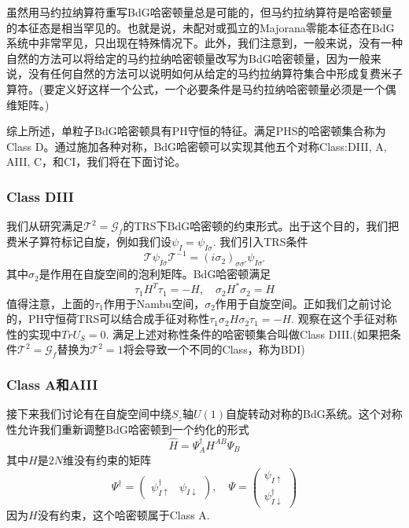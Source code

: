 \documentclass[a4paper]{article}
\numberwithin{equation}{subsection}
\newcommand{\mT}{\mathcal{T}}
\begin{document}
虽然用马约拉纳算符重写BdG哈密顿量总是可能的，但马约拉纳算符是哈密顿量的本征态是相当罕见的。也就是说，未配对或孤立的Majorana零能本征态在BdG系统中非常罕见，只出现在特殊情况下。此外，我们注意到，一般来说，没有一种自然的方法可以将给定的马约拉纳哈密顿量改写为BdG哈密顿量，因为一般来说，没有任何自然的方法可以说明如何从给定的马约拉纳算符集合中形成复费米子算符。(要定义好这样一个公式，一个必要条件是马约拉纳哈密顿量必须是一个偶维矩阵。)

综上所述，单粒子BdG哈密顿具有PH守恒的特征。满足PHS的哈密顿集合称为Class D。通过施加各种对称，BdG哈密顿可以实现其他五个对称Class:DIII, A, AIII, C，和CI，我们将在下面讨论。
\subsubsection{Class DIII}
我们从研究满足$\mT^2=\mathcal{G}_f$的TRS下BdG哈密顿的约束形式。出于这个目的，我们把费米子算符标记自旋，例如我们设$\psi_I=\psi_{I\sigma}$. 我们引入TRS条件
\begin{equation}
    \mT\psi_{I\sigma}\mT^{-1}=(i\sigma_2)_{\sigma\sigma'}\psi_{I\sigma'}
\end{equation}
其中$\sigma_2$是作用在自旋空间的泡利矩阵。BdG哈密顿满足
\begin{equation}
    \tau_1 H^T \tau_1=-H,\quad\sigma_2 H^*\sigma_2=H
\end{equation}
值得注意，上面的$\tau_1$作用于Nambu空间，$\sigma_2$作用于自旋空间。正如我们之前讨论的，PH守恒荷TRS可以结合成手征对称性$\tau_1\sigma_2 H\sigma_2\tau_1=-H$. 观察在这个手征对称性的实现中$TrU_S=0$. 满足上述对称性条件的哈密顿集合叫做Class DIII.(如果把条件$\mT^2=\mathcal{G}_f$替换为$\mT^2=1$将会导致一个不同的Class，称为BDI)

\subsubsection{Class A和AIII}
接下来我们讨论有在自旋空间中绕$S_z$轴$U(1)$自旋转动对称的BdG系统。这个对称性允许我们重新调整BdG哈密顿到一个约化的形式
\begin{equation}\label{class a}
    \hat{H}=\Psi_A^\dagger H^{AB}\Psi_B
\end{equation}
其中$H$是$2N$维没有约束的矩阵
\begin{equation}\label{spinor}
    \Psi^\dagger=\begin{pmatrix}
        \psi_{I\uparrow}^\dagger&\psi_{I\downarrow}
    \end{pmatrix},\quad \Psi=\begin{pmatrix}
        \psi_{I\uparrow}\\
        \psi_{I\downarrow}^\dagger
    \end{pmatrix}
\end{equation}
因为$H$没有约束，这个哈密顿属于Class A.
\end{document}
